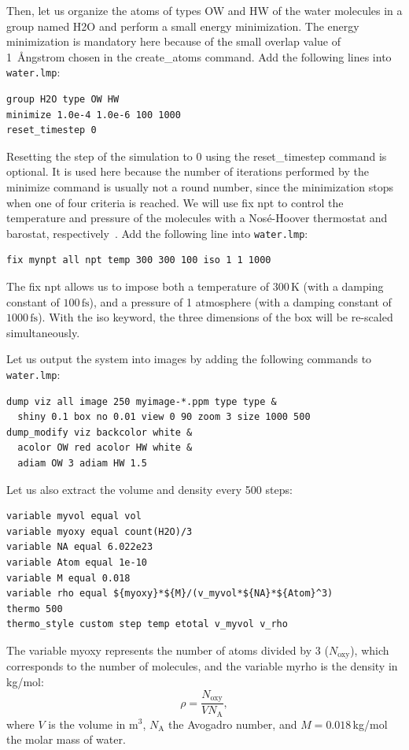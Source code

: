 \documentclass[9pt,tutorial]{livecoms}
\newcommand{\lmpcmd}[1]{\hspace{0pt}\colorbox{listing}{\textcolor{command}{\small{#1}}}\hspace{0pt}} %
\newcommand{\flecmd}[1]{\textcolor{command}{\texttt{#1}}} %
\begin{document}
Then, let us organize the atoms of types OW and HW of the water molecules in a
group named \lmpcmd{H2O} and perform a small energy minimization.  The energy
minimization is mandatory here because of the small \lmpcmd{overlap} value
of 1~Ångstrom chosen in the \lmpcmd{create\_atoms} command.  Add the following lines into \flecmd{water.lmp}:
\begin{lstlisting}
group H2O type OW HW
minimize 1.0e-4 1.0e-6 100 1000
reset_timestep 0
\end{lstlisting}
Resetting the step of the simulation to 0 using the
\lmpcmd{reset\_timestep} command is optional.
It is used here because the number of iterations performed by the \lmpcmd{minimize}
command is usually not a round number, since the minimization stops when one of
four criteria is reached.  We will use \lmpcmd{fix npt} to control the temperature
and pressure of the molecules with a Nosé-Hoover thermostat and barostat,
respectively~\cite{nose1984unified, hoover1985canonical, martyna1994constant}.
Add the following line into \flecmd{water.lmp}:
\begin{lstlisting}
fix mynpt all npt temp 300 300 100 iso 1 1 1000
\end{lstlisting}
The \lmpcmd{fix npt} allows us to impose both a temperature of $300\,\text{K}$
(with a damping constant of $100\,\text{fs}$), and a pressure of 1 atmosphere
(with a damping constant of $1000\,\text{fs}$).  With the \lmpcmd{iso} keyword,
the three dimensions of the box will be re-scaled simultaneously.

Let us output the system into images by adding the following commands to \flecmd{water.lmp}:
\begin{lstlisting}
dump viz all image 250 myimage-*.ppm type type &
  shiny 0.1 box no 0.01 view 0 90 zoom 3 size 1000 500
dump_modify viz backcolor white &
  acolor OW red acolor HW white &
  adiam OW 3 adiam HW 1.5
\end{lstlisting}
Let us also extract the volume and density every 500 steps:
\begin{lstlisting}
variable myvol equal vol
variable myoxy equal count(H2O)/3
variable NA equal 6.022e23
variable Atom equal 1e-10
variable M equal 0.018
variable rho equal ${myoxy}*${M}/(v_myvol*${NA}*${Atom}^3)
thermo 500
thermo_style custom step temp etotal v_myvol v_rho
\end{lstlisting}
The variable \lmpcmd{myoxy} represents the number of atoms divided by 3 ($N_\text{oxy}$),
which corresponds to the number of molecules, and the variable \lmpcmd{myrho} is
the density in kg/mol:
\begin{equation}
\rho = \dfrac{N_\text{oxy}}{V N_\text{A}},
\end{equation}
where $V$ is the volume in m$^3$, $N_\text{A}$ the Avogadro number, and
$M = 0.018$\,kg/mol the molar mass of water.
\end{document}

